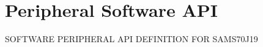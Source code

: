 \hypertarget{group__SAMS70J19__api}{}\section{Peripheral Software A\+PI}
\label{group__SAMS70J19__api}
S\+O\+F\+T\+W\+A\+RE P\+E\+R\+I\+P\+H\+E\+R\+AL A\+PI D\+E\+F\+I\+N\+I\+T\+I\+ON F\+OR S\+A\+M\+S70\+J19 